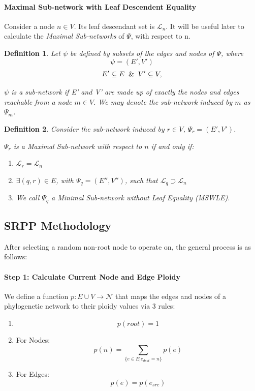 \documentclass{article}
\newtheorem{definition}{\color{bluem}Definition}
\begin{document}
\paragraph{Maximal Sub-network with Leaf Descendent Equality}
Consider a node $n \in V$. Its leaf descendant set is $\mathcal{L}_n$. It will be useful later to calculate the \textit{Maximal Sub-networks} of $\Psi$, with respect to n. 

\begin{definition}
    Let $\psi$ be defined by subsets of the edges and nodes of $\Psi$, where
    \[\psi = (E', V')\]
    \[ E' \subseteq E \And V' \subseteq V, \]

    $\psi$ is a sub-network if E' and V' are made up of exactly the nodes and edges reachable from a node $m \in V$. We may denote the sub-network induced by $m$ as $\Psi_{m}$.
\end{definition}

\begin{definition}

Consider the sub-network induced by $r \in V$, $\Psi_{r} = (E', V')$. 

 $\Psi_{r}$ is a \textit{Maximal Sub-network} with respect to $n$ if and only if:

\begin{enumerate}
    \item $\mathcal{L}_r = \mathcal{L}_n$
    \item $\exists (q, r) \in E$, with $\Psi_{q} = (E'', V'')$, such that
    $\mathcal{L}_{q} \supset \mathcal{L}_n$ 
    \item We call $\Psi_q$ a Minimal Sub-network without Leaf Equality (MSWLE).
\end{enumerate}
\end{definition}

\subsection{SRPP Methodology}
After selecting a random non-root node to operate on, the general process is as follows:

\paragraph{\color{bluem} Step 1: Calculate Current Node and Edge Ploidy}

We define a function $p : E\cup V \rightarrow \mathcal{N}$ that maps the edges and nodes of a phylogenetic network to their ploidy values via 3 rules:
\begin{enumerate}
    \item \[p(root) = 1\]
    \item For Nodes: \[p(n) = \sum_{\{e \in E | e_{dest} = n\}} p(e) \]
    \item For Edges: \[p(e) = p(e_{src})\] 
    
\end{enumerate}
\end{document}
